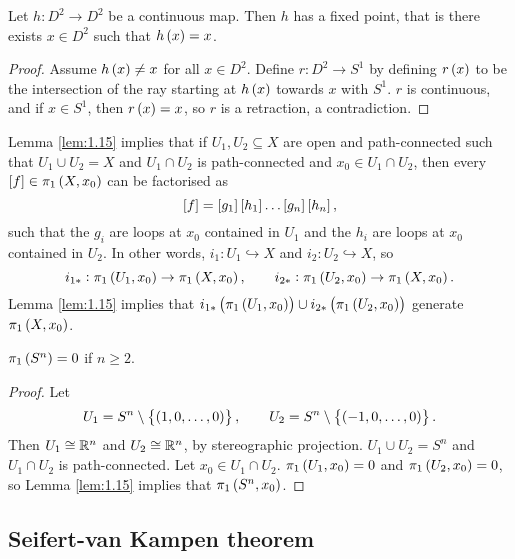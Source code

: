 \begin{theorem}
Let $ h : D^2 \to D^2 $ be a continuous map. Then $ h $ has a fixed point, that is there exists $ x \in D^2 $ such that $ h\br{x} = x $.
\end{theorem}

\begin{proof}
Assume $ h\br{x} \ne x $ for all $ x \in D^2 $. Define $ r : D^2 \to S^1 $ by defining $ r\br{x} $ to be the intersection of the ray starting at $ h\br{x} $ towards $ x $ with $ S^1 $. $ r $ is continuous, and if $ x \in S^1 $, then $ r\br{x} = x $, so $ r $ is a retraction, a contradiction.
\end{proof}

Lemma \ref{lem:1.15} implies that if $ U_1, U_2 \subseteq X $ are open and path-connected such that $ U_1 \cup U_2 = X $ and $ U_1 \cap U_2 $ is path-connected and $ x_0 \in U_1 \cap U_2 $, then every $ \sbr{f} \in \pi_1\br{X, x_0} $ can be factorised as
$$ \sbr{f} = \sbr{g_1}\sbr{h_1} \dots \sbr{g_n}\sbr{h_n}, $$
such that the $ g_i $ are loops at $ x_0 $ contained in $ U_1 $ and the $ h_i $ are loops at $ x_0 $ contained in $ U_2 $. In other words, $ i_1 : U_1 \hookrightarrow X $ and $ i_2 : U_2 \hookrightarrow X $, so
$$ i_{1*} : \pi_1\br{U_1, x_0} \to \pi_1\br{X, x_0}, \qquad i_{2*} : \pi_1\br{U_2, x_0} \to \pi_1\br{X, x_0}. $$
Lemma \ref{lem:1.15} implies that $ i_{1*}\br{\pi_1\br{U_1, x_0}} \cup i_{2*}\br{\pi_1\br{U_2, x_0}} $ generate $ \pi_1\br{X, x_0} $.

\begin{proposition}
$ \pi_1\br{S^n} = 0 $ if $ n \ge 2 $.
\end{proposition}

\begin{proof}
Let
$$ U_1 = S^n \setminus \cbr{\br{1, 0, \dots, 0}}, \qquad U_2 = S^n \setminus \cbr{\br{-1, 0, \dots, 0}}. $$
Then $ U_1 \cong \mathbb{R}^n $ and $ U_2 \cong \mathbb{R}^n $, by stereographic projection. $ U_1 \cup U_2 = S^n $ and $ U_1 \cap U_2 $ is path-connected. Let $ x_0 \in U_1 \cap U_2 $. $ \pi_1\br{U_1, x_0} = 0 $ and $ \pi_1\br{U_2, x_0} = 0 $, so Lemma \ref{lem:1.15} implies that $ \pi_1\br{S^n, x_0} $.
\end{proof}

\pagebreak

\subsection{Seifert-van Kampen theorem}

